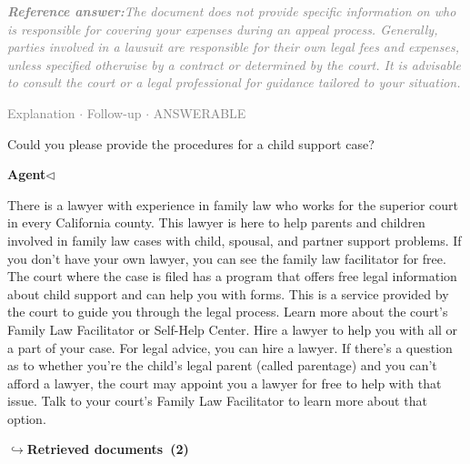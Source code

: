 \documentclass[a4paper,11pt]{article}
\begin{document}
\begin{refanswerenv}
{\footnotesize\textit{\textcolor{gray}{\textbf{Reference answer:}\enspace The document does not provide specific information on who is responsible for covering your expenses during an appeal process. Generally, parties involved in a lawsuit are responsible for their own legal fees and expenses, unless specified otherwise by a contract or determined by the court. It is advisable to consult the court or a legal professional for guidance tailored to your situation.}}}
\end{refanswerenv}
\vspace{0.5em}
\hfill{\tiny\textcolor{gray}{Explanation $\cdot$ Follow-up $\cdot$ ANSWERABLE}}
\begin{userbubble}
Could you please provide the procedures for a child support case?
\end{userbubble}
\noindent\hfill{\small\textcolor{agentcolor}{\textbf{Agent\enspace$\triangleleft$}}}
\begin{agentbubble}
There is a lawyer with experience in family law who works for the superior court in every California county. This lawyer is here to help parents and children involved in family law cases with child, spousal, and partner support problems. If you don't have your own lawyer, you can see the family law facilitator for free. The court where the case is filed has a program that offers free legal information about child support and can help you with forms. This is a service provided by the court to guide you through the legal process. Learn more about the court's Family Law Facilitator or Self-Help Center.  
Hire a lawyer to help you with all or a part of your case. For legal advice, you can hire a lawyer. If there's a question as to whether you're the child's legal parent (called parentage) and you can't afford a lawyer, the court may appoint you a lawyer for free to help with that issue. Talk to your court's Family Law Facilitator to learn more about that option.
\end{agentbubble}
\noindent\hfill{\footnotesize\textcolor{doccolor}{\textbf{$\hookrightarrow$\enspace Retrieved documents~(2)}}}
\end{document}
